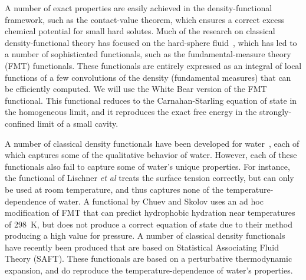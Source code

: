 \documentclass[twocolumn,amsmath,amssymb,prl]{revtex4-1}
\begin{document}
A number of exact properties are easily achieved in the
density-functional framework, such as the contact-value theorem, which
ensures a correct excess chemical potential for small hard solutes.
Much of the research on classical density-functional theory has
focused on the hard-sphere fluid~\cite{curtin1985, rosenfeld1989,
  rosenfeld1993, rosenfeld1997, tarazona1997, tarazona2000}, which has
led to a number of sophisticated functionals, such as the
fundamental-measure theory (FMT) functionals\cite{rosenfeld1989,
  rosenfeld1993, rosenfeld1997, tarazona1997, tarazona2000,
  roth2002whitebear, yu2002structures}.  These functionals are
entirely expressed as an integral of local functions of a few
convolutions of the density (fundamental measures) that can be
efficiently computed.  We will use the White Bear version of the FMT
functional\cite{roth2002whitebear, yu2002structures}.  This functional
reduces to the Carnahan-Starling equation of state in the homogeneous
limit, and it reproduces the exact free energy in the
strongly-confined limit of a small cavity.

A number of classical density functionals have been developed for
water~\cite{ding1987, Yang1992, yang1994density, gloor2002saft,
  gloor2004accurate, gloor2007prediction, Jaqaman2004,
  clark2006developing, chuev2006, lischner2010classical,
  fu2005vapor-liquid-dft,kiselev2006new, blas2001examination,
  sundararaman2012computationally}, each of
which captures some of the qualitative behavior of water.  However,
each of these functionals also fail to capture some of water's unique
properties.  For instance, the functional of Lischner \emph{et
  al}\cite{lischner2010classical} treats the surface tension
correctly, but can only be used at room temperature, and thus captures
none of the temperature-dependence of water.  A functional by Chuev
and Skolov\cite{chuev2006} uses an ad hoc modification of FMT that can
predict hydrophobic hydration near temperatures of 298~K, but does not
produce a correct equation of state due to their method producing a
high value for pressure.
A number of classical density functionals
have recently been produced that are based on Statistical Associating
Fluid Theory (SAFT)\cite{ segura1997associating, segura1998comparison,
  yu2002fmt-dft-inhomogeneous-associating,
  fu2005vapor-liquid-dft,gloor2002saft,muller2001molecular,
 clark2006developing, gloor2007prediction, gloor2004accurate,
  gross2009density, kahl2008modified, blas2001examination}.  These
functionals are based on a perturbative thermodynamic expansion, and
do reproduce the temperature-dependence of water's properties.
\end{document}

